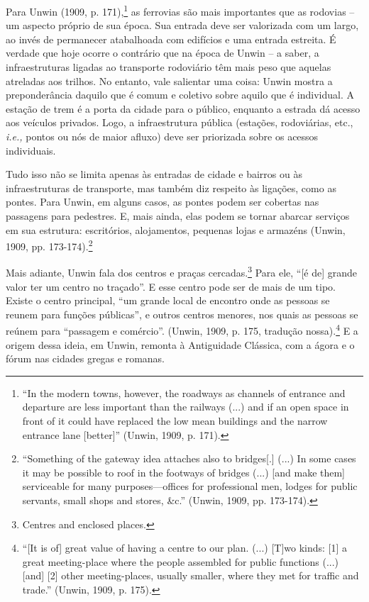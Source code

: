 \documentclass[12pt, a4paper]{book} %
\begin{document}
        Para Unwin (1909, p. 171),\footnote[57]{``In the modern towns, however, the roadways as channels of entrance and departure are less important than the railways (...) and if an open space in front of it could have replaced the low mean buildings and the narrow entrance lane [better]'' (Unwin, 1909, p. 171).} as ferrovias são mais importantes que as rodovias – um aspecto próprio de sua época. Sua entrada deve ser valorizada com um largo, ao invés de permanecer atabalhoada com edifícios e uma entrada estreita. É verdade que hoje ocorre o contrário que na época de Unwin – a saber, a infraestruturas ligadas ao transporte rodoviário têm mais peso que aquelas atreladas aos trilhos. No entanto, vale salientar uma coisa: Unwin mostra a preponderância daquilo que é comum e coletivo sobre aquilo que é individual. A estação de trem é a porta da cidade para o público, enquanto a estrada dá acesso aos veículos privados. Logo, a infraestrutura pública (estações, rodoviárias, etc., \textit{i.e.,} pontos ou nós de maior afluxo) deve ser priorizada sobre os acessos individuais.

        Tudo isso não se limita apenas às entradas de cidade e bairros ou às infraestruturas de transporte, mas também diz respeito às ligações, como as pontes. Para Unwin, em alguns casos, as pontes podem ser cobertas nas passagens para pedestres. E, mais ainda, elas podem se tornar abarcar serviços em sua estrutura: escritórios, alojamentos, pequenas lojas e armazéns (Unwin, 1909, pp. 173-174).\footnote[58]{``Something of the gateway idea attaches also to bridges[.] (...) In some cases it may be possible to roof in the footways of bridges (...) [and make them] serviceable for many purposes—offices for professional men, lodges for public servants, small shops and stores, \&c.'' (Unwin, 1909, pp. 173-174).}

        Mais adiante, Unwin fala dos centros e praças cercadas.\footnote[59]{Centres and enclosed places.} Para ele, ``[é de] grande valor ter um centro no traçado''. E esse centro pode ser de mais de um tipo. Existe o centro principal, ``um grande local de encontro onde as pessoas se reunem para funções públicas'', e outros centros menores, nos quais as pessoas se reúnem para ``passagem e comércio''. (Unwin, 1909, p. 175, tradução nossa).\footnote[60]{``[It is of] great value of having a centre to our plan. (...) [T]wo kinds: [1] a great meeting-place where the people assembled for public functions (...) [and] [2] other meeting-places, usually smaller, where they met for traffic and trade.'' (Unwin, 1909, p. 175).} E a origem dessa ideia, em Unwin, remonta à Antiguidade Clássica, com a ágora e o fórum nas cidades gregas e romanas.
\end{document}
